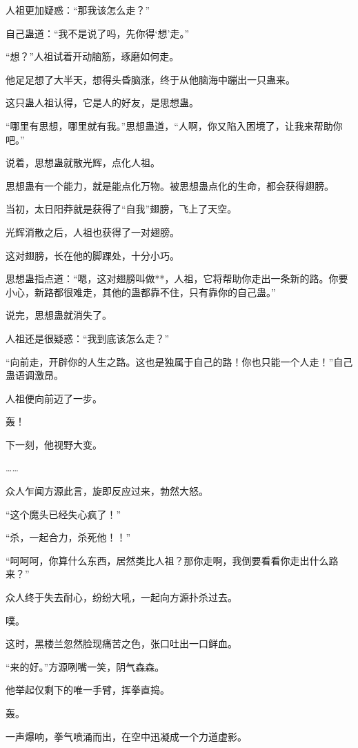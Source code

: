 \begin{this_body}
人祖更加疑惑：“那我该怎么走？”

自己蛊道：“我不是说了吗，先你得‘想’走。”

“想？”人祖试着开动脑筋，琢磨如何走。

他足足想了大半天，想得头昏脑涨，终于从他脑海中蹦出一只蛊来。

这只蛊人祖认得，它是人的好友，是思想蛊。

“哪里有思想，哪里就有我。”思想蛊道，“人啊，你又陷入困境了，让我来帮助你吧。”

说着，思想蛊就散光辉，点化人祖。

思想蛊有一个能力，就是能点化万物。被思想蛊点化的生命，都会获得翅膀。

当初，太日阳莽就是获得了“自我”翅膀，飞上了天空。

光辉消散之后，人祖也获得了一对翅膀。

这对翅膀，长在他的脚踝处，十分小巧。

思想蛊指点道：“嗯，这对翅膀叫做**，人祖，它将帮助你走出一条新的路。你要小心，新路都很难走，其他的蛊都靠不住，只有靠你的自己蛊。”

说完，思想蛊就消失了。

人祖还是很疑惑：“我到底该怎么走？”

“向前走，开辟你的人生之路。这也是独属于自己的路！你也只能一个人走！”自己蛊语调激昂。

人祖便向前迈了一步。

轰！

下一刻，他视野大变。

……

众人乍闻方源此言，旋即反应过来，勃然大怒。

“这个魔头已经失心疯了！”

“杀，一起合力，杀死他！！”

“呵呵呵，你算什么东西，居然类比人祖？那你走啊，我倒要看看你走出什么路来？”

众人终于失去耐心，纷纷大吼，一起向方源扑杀过去。

噗。

这时，黑楼兰忽然脸现痛苦之色，张口吐出一口鲜血。

“来的好。”方源咧嘴一笑，阴气森森。

他举起仅剩下的唯一手臂，挥拳直捣。

轰。

一声爆响，拳气喷涌而出，在空中迅凝成一个力道虚影。

\end{this_body}

